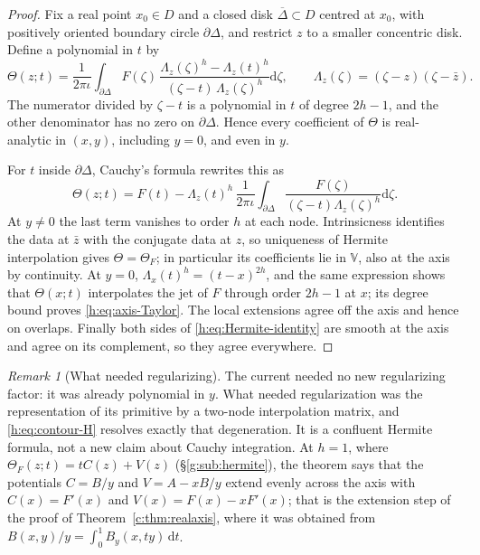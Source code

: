 \documentclass[11pt,a4paper]{article}
\numberwithin{equation}{section}
\theoremstyle{definition}
\theoremstyle{remark}
\newtheorem{remark}[theorem]{Remark}
\theoremstyle{plain}
\newcommand{\pot}{C}          %
\newcommand{\potV}{V}         %
\newcommand{\dd}{\mathrm d}
\newcommand{\VV}{\mathbb V}                       %
\newcommand{\Herm}{\Theta}                        %
\newcommand{\Rq}{\Lambda}                         %
\begin{document}
\begin{proof}
Fix a real point $x_0\in D$ and a closed disk $\overline\Delta\subset D$
centred at $x_0$, with positively oriented boundary circle $\partial\Delta$, and
restrict $z$ to a smaller concentric disk. Define a polynomial in $t$ by
\begin{equation}\label{h:eq:contour-H}
 \Herm(z;t)=\frac1{2\pi\iota}\int_{\partial\Delta}F(\zeta)\,
 \frac{\Rq_z(\zeta)^h-\Rq_z(t)^h}{(\zeta-t)\,\Rq_z(\zeta)^h}\dd\zeta ,
 \qquad \Rq_z(\zeta)=(\zeta-z)(\zeta-\bar z).
\end{equation}
The numerator divided by $\zeta-t$ is a polynomial in $t$ of degree $2h-1$, and
the other denominator has no zero on $\partial\Delta$. Hence every coefficient
of $\Herm$ is real-analytic in $(x,y)$, including $y=0$, and even in $y$.

For $t$ inside $\partial\Delta$, Cauchy's formula rewrites this as
\[
 \Herm(z;t)=F(t)-\Rq_z(t)^h\,\frac1{2\pi\iota}\int_{\partial\Delta}
 \frac{F(\zeta)}{(\zeta-t)\Rq_z(\zeta)^h}\dd\zeta .
\]
At $y\ne0$ the last term vanishes to order $h$ at each node. Intrinsicness
identifies the data at $\bar z$ with the conjugate data at $z$, so uniqueness
of Hermite interpolation gives $\Herm=\Herm_F$; in particular its coefficients
lie in $\VV$, also at the axis by continuity. At $y=0$,
$\Rq_x(t)^h=(t-x)^{2h}$, and the same expression shows that $\Herm(x;t)$
interpolates the jet of $F$ through order $2h-1$ at $x$; its degree bound
proves \eqref{h:eq:axis-Taylor}. The local extensions agree off the axis and
hence on overlaps. Finally both sides of \eqref{h:eq:Hermite-identity} are
smooth at the axis and agree on its complement, so they agree everywhere.
\end{proof}

\begin{remark}[What needed regularizing]
\label{h:rem:confluence}
The current needed no new regularizing factor: it was already polynomial in
$y$. What needed regularization was the representation of its primitive by a
two-node interpolation matrix, and \eqref{h:eq:contour-H} resolves exactly
that degeneration. It is a confluent Hermite formula, not a new claim about
Cauchy integration. At $h=1$, where $\Herm_F(z;t)=t\pot(z)+\potV(z)$
(\S\ref{g:sub:hermite}), the theorem says that the potentials $\pot=B/y$ and
$\potV=A-xB/y$ extend evenly across the axis with $\pot(x)=F'(x)$ and
$\potV(x)=F(x)-xF'(x)$; that is the extension step of the proof of
Theorem~\ref{c:thm:realaxis}, where it was obtained from
$B(x,y)/y=\int_0^1B_y(x,ty)\,\dd t$.
\end{remark}
\end{document}
